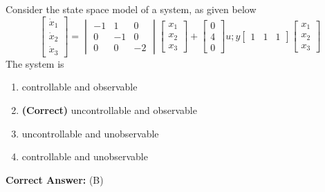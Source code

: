 \documentclass[11pt,a4paper]{article}
\begin{document}
\noindent Consider the state space model of a system, as given below 
\[
\begin{bmatrix} \dot{x}_{1}\\ \dot{x}_{2}\\ \dot{x}_{3} \end{bmatrix}=\begin{vmatrix} -1 & 1&0 \\ 0 & -1 & 0\\ 0&0 & -2 \end{vmatrix}\begin{bmatrix} x_{1}\\ x_{2}\\ x_{3} \end{bmatrix}+\begin{bmatrix} 0\\ 4\\ 0 \end{bmatrix}u;y\begin{bmatrix} 1 & 1 &1 \end{bmatrix}\begin{bmatrix} x_{1}\\ x_{2}\\ x_{3} \end{bmatrix}
\]
 The system is


\begin{enumerate}[label=(\Alph*)]
    \item controllable and observable
    \item \textbf{(Correct)} uncontrollable and observable
    \item uncontrollable and unobservable
    \item controllable and unobservable
\end{enumerate}

\noindent \textbf{Correct Answer:} (B)
\end{document}
